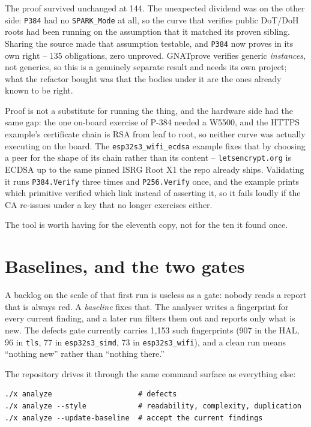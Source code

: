 The proof survived unchanged at 144. The unexpected dividend was on the other side:
\lstinline{P384} had no \lstinline{SPARK_Mode} at all, so the curve that verifies
public DoT/DoH roots had been running on the assumption that it matched its proven
sibling. Sharing the source made that assumption testable, and \lstinline{P384}
now proves in its own right -- 135 obligations, zero unproved. GNATprove verifies
generic \emph{instances}, not generics, so this is a genuinely separate result and
needs its own project; what the refactor bought was that the bodies under it are
the ones already known to be right.

Proof is not a substitute for running the thing, and the hardware side had the
same gap: the one on-board exercise of P-384 needed a W5500, and the HTTPS
example's certificate chain is RSA from leaf to root, so neither curve was
actually executing on the board. The \texttt{esp32s3\_wifi\_ecdsa} example fixes
that by choosing a peer for the shape of its chain rather than its content --
\texttt{letsencrypt.org} is ECDSA up to the same pinned ISRG Root X1 the repo
already ships. Validating it runs \lstinline{P384.Verify} three times and
\lstinline{P256.Verify} once, and the example prints which primitive verified
which link instead of asserting it, so it fails loudly if the CA re-issues under
a key that no longer exercises either.

The tool is worth having for the eleventh copy, not for the ten it found once.

\section{Baselines, and the two gates}

A backlog on the scale of that first run is useless as a gate: nobody reads a report
that is always red. A \emph{baseline} fixes that. The analyser writes a fingerprint for
every current finding, and a later run filters them out and reports only what is new. The
defects gate currently carries 1{,}153 such fingerprints (907 in the HAL, 96 in
\texttt{tls}, 77 in \texttt{esp32s3\_simd}, 73 in \texttt{esp32s3\_wifi}), and a clean run
means ``nothing new'' rather than ``nothing there.''

The repository drives it through the same command surface as everything else:

\begin{lstlisting}[style=sh]
./x analyze                    # defects
./x analyze --style            # readability, complexity, duplication
./x analyze --update-baseline  # accept the current findings
\end{lstlisting}

